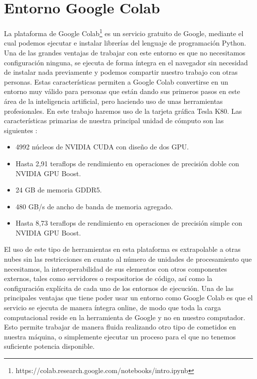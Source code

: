\section{Entorno Google Colab}\label{sec:entorno-google-colab}
La plataforma de Google Colab\footnote{https://colab.research.google.com/notebooks/intro.ipynb} es un servicio gratuito de Google, mediante el cual podemos ejecutar e instalar librerías del lenguaje de programación Python.
Una de las grandes ventajas de trabajar con este entorno es que no necesitamos configuración ninguna, se ejecuta de forma íntegra en el navegador sin necesidad de instalar nada previamente y podemos compartir
nuestro trabajo con otras personas.
Estas características permiten a Google Colab convertirse en un entorno muy válido para personas que están dando sus primeros pasos en este área de la inteligencia artificial, pero haciendo uso
de unas herramientas profesionales.
En este trabajo haremos uso de la tarjeta gráfica Tesla K80.
Las características primarias de nuestra principal unidad de cómputo son las siguientes :
\begin{itemize}
    \item 4992 núcleos de NVIDIA CUDA con diseño de dos GPU\@.
    \item Hasta 2,91 teraflops de rendimiento en operaciones de precisión doble con NVIDIA GPU Boost.
    \item 24 GB de memoria GDDR5.
    \item 480 GB/s de ancho de banda de memoria agregado.
    \item Hasta 8,73 teraflops de rendimiento en operaciones de precisión simple con NVIDIA GPU Boost.
\end{itemize}
El uso de este tipo de herramientas en esta plataforma es extrapolable a otras nubes sin las restricciones en cuanto al número de unidades de procesamiento que necesitamos, la interoperabilidad de sus elementos con otros componentes externos, tales como servidores o respositorios de código, así como la configuración explícita de cada uno de los entornos de ejecución.
Una de las principales ventajas que tiene poder usar un entorno como Google Colab es que el servicio se ejecuta de manera íntegra online, de modo que toda la carga computacional reside en la herramienta de Google y no en nuestro computador.
Esto permite trabajar de manera fluida realizando otro tipo de cometidos en nuestra máquina, o simplemente ejecutar un proceso para el que no tenemos suficiente potencia disponible.
